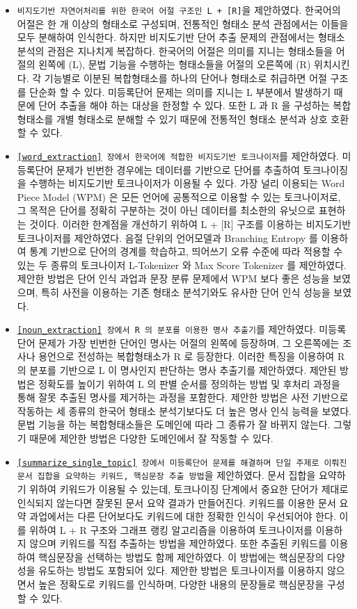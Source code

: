 \documentclass[11pt]{article}
\begin{document}
\begin{itemize}
  \item \texttt{비지도기반 자연어처리를 위한 한국어 어절 구조인 L + [R]}을 제안하였다. 한국어의 어절은 한 개 이상의 형태소로 구성되며, 전통적인 형태소 분석 관점에서는 이들을 모두 분해하여 인식한다. 하지만 비지도기반 단어 추출 문제의 관점에서는 형태소 분석의 관점은 지나치게 복잡하다. 한국어의 어절은 의미를 지니는 형태소들을 어절의 왼쪽에 (L), 문법 기능을 수행하는 형태소들을 어절의 오른쪽에 (R) 위치시킨다. 각 기능별로 이분된 복합형태소를 하나의 단어나 형태소로 취급하면 어절 구조를 단순화 할 수 있다. 미등록단어 문제는 의미를 지니는 L 부분에서 발생하기 때문에 단어 추출을 해야 하는 대상을 한정할 수 있다. 또한 L 과 R 을 구성하는 복합형태소를 개별 형태소로 분해할 수 있기 때문에 전통적인 형태소 분석과 상호 호환할 수 있다.
  \item \texttt{\ref{word_extraction} 장에서 한국어에 적합한 비지도기반 토크나이저}를 제안하였다. 미등록단어 문제가 빈번한 경우에는 데이터를 기반으로 단어를 추출하여 토크나이징을 수행하는 비지도기반 토크나이저가 이용될 수 있다. 가장 널리 이용되는 Word Piece Model (WPM) 은 모든 언어에 공통적으로 이용할 수 있는 토크나이저로, 그 목적은 단어를 정확히 구분하는 것이 아닌 데이터를 최소한의 유닛으로 표현하는 것이다. 이러한 한계점을 개선하기 위하여 L + [R] 구조를 이용하는 비지도기반 토크나이저를 제안하였다. 음절 단위의 언어모델과 Branching Entropy 를 이용하여 통계 기반으로 단어의 경계를 학습하고, 띄어쓰기 오류 수준에 따라 적용할 수 있는 두 종류의 토크나이저 L-Tokenizer 와 Max Score Tokenizer 를 제안하였다. 제안한 방법은 단어 인식 과업과 문장 분류 문제에서 WPM 보다 좋은 성능을 보였으며, 특히 사전을 이용하는 기존 형태소 분석기와도 유사한 단어 인식 성능을 보였다.
  \item \texttt{\ref{noun_extraction} 장에서 R 의 분포를 이용한 명사 추출기}를 제안하였다. 미등록단어 문제가 가장 빈번한 단어인 명사는 어절의 왼쪽에 등장하며, 그 오른쪽에는 조사나 용언으로 전성하는 복합형태소가 R 로 등장한다. 이러한 특징을 이용하여 R 의 분포를 기반으로 L 이 명사인지 판단하는 명사 추출기를 제안하였다. 제안된 방법은 정확도를 높이기 위하여 L 의 판별 순서를 정의하는 방법 및 후처리 과정을 통해 잘못 추출된 명사를 제거하는 과정을 포함한다. 제안한 방법은 사전 기반으로 작동하는 세 종류의 한국어 형태소 분석기보다도 더 높은 명사 인식 능력을 보였다. 문법 기능을 하는 복합형태소들은 도메인에 따라 그 종류가 잘 바뀌지 않는다. 그렇기 때문에 제안한 방법은 다양한 도메인에서 잘 작동할 수 있다.
  \item \texttt{\ref{summarize_single_topic} 장에서 미등록단어 문제를 해결하며 단일 주제로 이뤄진 문서 집합을 요약하는 키워드, 핵심문장 추출 방법}을 제안하였다. 문서 집합을 요약하기 위하여 키워드가 이용될 수 있는데, 토크나이징 단계에서 중요한 단어가 제대로 인식되지 않는다면 잘못된 문서 요약 결과가 만들어진다. 키워드를 이용한 문서 요약 과업에서는 다른 단어보다도 키워드에 대한 정확한 인식이 우선되어야 한다. 이를 위하여 L + R 구조와 그래프 랭킹 알고리즘을 이용하여 토크나이저를 이용하지 않으며 키워드를 직접 추출하는 방법을 제안하였다. 또한 추출된 키워드를 이용하여 핵심문장을 선택하는 방법도 함께 제안하였다. 이 방법에는 핵심문장의 다양성을 유도하는 방법도 포함되어 있다. 제안한 방법은 토크나이저를 이용하지 않으면서 높은 정확도로 키워드를 인식하며, 다양한 내용의 문장들로 핵심문장을 구성할 수 있다.

\end{itemize}
\end{document}
